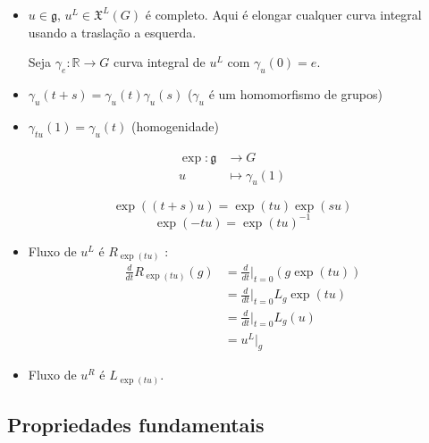 \begin{exercise}\leavevmode 
	\begin{itemize}
	\item $u\in\mathfrak{g}$, $u^L\in\mathfrak{X}^L(G)$ \'e completo. Aqui \'e elongar cualquer curva integral usando a trasla\c c\~ao a esquerda.

	Seja $\gamma_e:\mathbb{R}\to G$ curva integral de $u^L$ com  $\gamma_u(0)=e$. 

	\item $\gamma_u(t+s)=\gamma_u(t)\gamma_u(s)$ ($\gamma_u$  \'e um homomorfismo de grupos)

	\item $\gamma_{tu}(1)=\gamma_{u}(t)$ (homogenidade)
	\end{itemize}
\end{exercise}

\begin{defn}
	\begin{align*}
		\operatorname{exp}:\mathfrak{g}  &\longrightarrow G \\
		u &\longmapsto \gamma_u(1)
	\end{align*}
\end{defn}

\begin{remark}
\[\operatorname{exp}((t+s) u)=\operatorname{exp}(tu) \operatorname{exp}(su) \]
\[\operatorname{exp}(-tu) =\operatorname{exp}(tu)^{-1}\]
\end{remark}

\begin{remark}\leavevmode 
	\begin{itemize}
	\item Fluxo de $u^L$ \'e $R_{\operatorname{exp}(tu)}$ :
		\begin{align*}
			\frac{d}{dt}R_{\operatorname{exp}(tu)}(g)&=\frac{d}{dt}\Big|_{t=0}(g\operatorname{exp}(tu) )\\
			&=\frac{d}{dt}\Big|_{t=0}L_g\operatorname{exp}(tu)\\
			 &=\frac{d}{dt}|_{t=0}L_g(u)\\
			 &=u^L|_{g}
		\end{align*}
	\item Fluxo de $u^R$ \'e $L_{\operatorname{exp}(tu)}$.
	\end{itemize}
\end{remark}

\subsection{Propriedades fundamentais}

